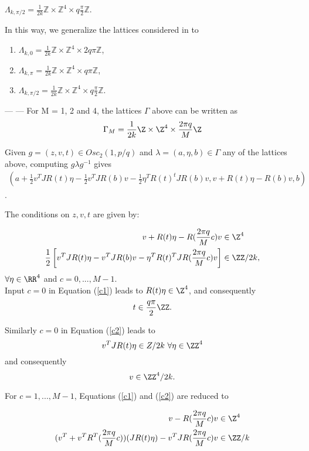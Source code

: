 \documentclass[11pt]{amsart}
\theoremstyle{plain}
\theoremstyle{definition}
\theoremstyle{remark}
\begin{document}
  $\Lambda_{k,\pi/2}=\frac1{2k} \mathbb Z\times \mathbb Z^4 \times q\frac{\pi}2 \mathbb Z$.
  
  In this way, we generalize the lattices considered in \cite{BOV} to 
  \begin{enumerate}
  	\item $\Lambda_{k,0}=\frac1{2k} \mathbb Z\times \mathbb Z^4 \times 2q\pi\mathbb Z$,
  	\item $\Lambda_{k,\pi}=\frac1{2k} \mathbb Z\times \mathbb Z^4 \times q\pi\mathbb Z$,
  	\item $\Lambda_{k,\pi/2}=\frac1{2k} \mathbb Z\times \mathbb Z^4 \times q\frac{\pi}2 \mathbb Z$.
  	\end{enumerate}
---
---
For M = 1, 2 and 4, the lattices $\Gamma$ above can be written as $$\Gamma_M = \frac{1}{2 k} \Z \times \Z^4 \times \frac{2 \pi q}{M} \Z$$

Given $g=(z,v,t) \in Osc_2(1,p/q)$ and $\lambda=(a,\eta,b) \in \Gamma$ any of the lattices above, computing $g \lambda g^{-1}$ gives
\begin{eqnarray}
    (a + \frac{1}{2}v^T J R(t) \eta - \frac{1}{2} v^T J R(b) v - \frac{1}{2} \eta^T R(t)^t J R(b) v, v + R(t) \eta - R(b) v, b)
\end{eqnarray}.

The conditions on $z,v,t$ are given by:

\begin{align}
    v + R(t) \eta - R(\frac{2 \pi q}{M} c)v &\in \Z^4   \label{c1} \\ 
    \frac{1}{2} \left[ v^T J R(t) \eta - v^T J R(b) v - \eta^T R(t)^TJR(\frac{2 \pi q}{M} c) v \right] &\in \ZZ/{2k}, \label{c2}
\end{align}
$\forall \eta \in \RR^4$ and $c = 0, ..., M-1$. \\

Input $c=0$ in Equation (\ref{c1}) leads to $R(t) \eta \in \Z^4$, and consequently 
\begin{equation}
t \in \frac{q \pi}{2} \ZZ. \label{cc1}
\end{equation}

Similarly $c=0$ in Equation (\ref{c2}) leads to $$ v^T J R(t) \eta \in Z / {2 k} \,\, \forall \eta \in \ZZ^4 $$     
and consequently 
\begin{equation}
    v \in \ZZ^4/{2k}. \label{cc2}
\end{equation}

For $c = 1, ..., M-1$, Equations (\ref{c1}) and (\ref{c2}) are reduced to

\begin{align}
    v - R(\frac{2 \pi q}{M}c) v &\in \Z^4  \label{ccc1} \\
    (v^T + v^T R^T(\frac{2 \pi q}{M}c)) (J R(t) \eta) - v^T J R(\frac{2 \pi q}{M}c) v  &\in \ZZ/{k} \label{ccc2}
\end{align}
\end{document}
